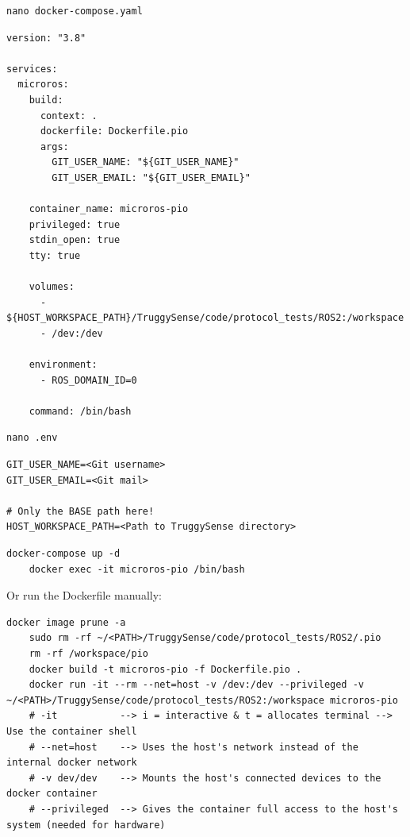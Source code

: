 \documentclass[ti,oneside,10pt]{uantwerpenreport}
\begin{document}
\begin{lstlisting}[style=cmd]
    nano docker-compose.yaml
\end{lstlisting}

\begin{lstlisting}[style=script]
version: "3.8"

services:
  microros:
    build:
      context: .
      dockerfile: Dockerfile.pio
      args:
        GIT_USER_NAME: "${GIT_USER_NAME}"
        GIT_USER_EMAIL: "${GIT_USER_EMAIL}"

    container_name: microros-pio
    privileged: true
    stdin_open: true
    tty: true

    volumes:
      - ${HOST_WORKSPACE_PATH}/TruggySense/code/protocol_tests/ROS2:/workspace
      - /dev:/dev

    environment:
      - ROS_DOMAIN_ID=0

    command: /bin/bash
\end{lstlisting}

\begin{lstlisting}[style=cmd]
    nano .env
\end{lstlisting}

\begin{lstlisting}[style=script]
GIT_USER_NAME=<Git username>
GIT_USER_EMAIL=<Git mail>

# Only the BASE path here!
HOST_WORKSPACE_PATH=<Path to TruggySense directory>
\end{lstlisting}

\begin{lstlisting}[style=cmd]
    docker-compose up -d
    docker exec -it microros-pio /bin/bash
\end{lstlisting}

Or run the Dockerfile manually:
\begin{lstlisting}[style=cmd]
    docker image prune -a
    sudo rm -rf ~/<PATH>/TruggySense/code/protocol_tests/ROS2/.pio
    rm -rf /workspace/pio
    docker build -t microros-pio -f Dockerfile.pio .
    docker run -it --rm --net=host -v /dev:/dev --privileged -v ~/<PATH>/TruggySense/code/protocol_tests/ROS2:/workspace microros-pio
    # -it           --> i = interactive & t = allocates terminal --> Use the container shell
    # --net=host    --> Uses the host's network instead of the internal docker network
    # -v dev/dev    --> Mounts the host's connected devices to the docker container
    # --privileged  --> Gives the container full access to the host's system (needed for hardware) 
\end{lstlisting}
\end{document}
